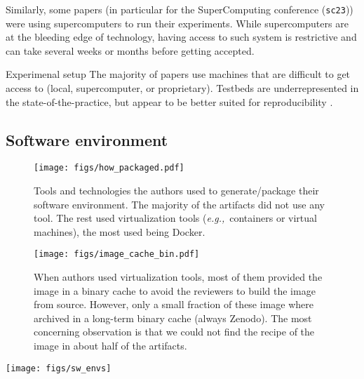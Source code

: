 \documentclass[sigconf,natbib=false]{acmart}
\newcommand{\eg}{\emph{e.g.,}}
\newcommand{\ad}{Artifact Description}
\newcommand{\aeval}{Artifact Evaluation}
\begin{document}
Similarly, some papers (in particular for the SuperComputing conference (\texttt{sc23})) were using supercomputers to run their experiments.
While supercomputers are at the bleeding edge of technology, having access to such system is restrictive and can take several weeks or months before getting accepted.

\begin{lesson}{Experimenal setup}{}
  The majority of papers use machines that are difficult to get access to (local, supercomputer, or proprietary). 
  Testbeds are underrepresented in the state-of-the-practice, but appear to be better suited for reproducibility \cite{nussbaum2017testbeds}.
\end{lesson}

\subsection{Software environment}\label{sec:sop:sw}

\begin{figure*}
  \centering
  \begin{subfigure}{0.49\textwidth}
    \centering
    \texttt{[image: figs/how\_packaged.pdf]}
    \caption{Tools and technologies the authors used to generate/package their software environment. The majority of the artifacts did not use any tool. The rest used virtualization tools (\eg\ containers or virtual machines), the most used being Docker.}\label{fig:techno}
  \end{subfigure}
  \hfill
  \begin{subfigure}{0.49\textwidth}
      \centering
      \texttt{[image: figs/image\_cache\_bin.pdf]}
    \caption{When authors used virtualization tools, most of them provided the image in a binary cache to avoid the reviewers to build the image from source. However, only a small fraction of these image where archived in a long-term binary cache (always Zenodo). The most concerning observation is that we could not find the recipe of the image in about half of the artifacts.}\label{fig:cache_bin}
  \end{subfigure}
  \caption{Tools and technologies used to generate and package the software environment for the \aeval\ (Figure \ref{fig:techno}), and state of the image and its recipe in the case of the use of virtual tools (Figure \ref{fig:cache_bin}).}\label{fig:techo_cache}
\end{figure*}

\begin{figure*}
  \centering
  \texttt{[image: figs/sw\_envs]}
  \caption{Techniques used to share the software environment in the \ad s. Note than an paper can use several of these techniques.}\label{fig:sw_envs}
\end{figure*}
\end{document}
